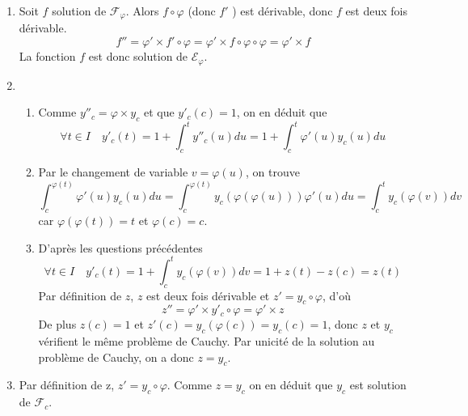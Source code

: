 \begin{enumerate}
\begin{enumerate}
\end{enumerate}
\item Soit $f$ solution de $\mathcal F_\varphi$. Alors $f\circ \varphi $  (donc $f'$ ) est dérivable, donc $f$ est deux fois dérivable.
$$f''=\varphi'\times f'\circ \varphi=\varphi'\times f\circ\varphi\circ \varphi=\varphi'\times f$$
La fonction $f$ est donc solution de $\mathcal E_\varphi$.
\item
\begin{enumerate}
\item Comme $y''_c=\varphi\times y_c$ et que $y'_c(c)=1$, on en déduit que 
$$\forall t\in I\quad y'_c(t)=1+\int_c^ty''_c(u)du=1+\int_c^t\varphi'(u)y_c(u)du$$
\item Par le changement de variable  $v=\varphi(u)$, on trouve
\begin{displaymath}
\int_c^{\varphi(t)}\varphi'(u)y_c(u)du
= \int_c^{\varphi(t)}y_c(\varphi(\varphi(u)))\varphi'(u)du
= \int_c^{t}y_c(\varphi(v))dv  
\end{displaymath}
car $\varphi(\varphi(t))=t$ et $\varphi(c)=c$. 
\item D'après les questions précédentes
$$\forall t\in I\quad y'_c(t)=1+\int_c^t y_c(\varphi(v))dv=1+z(t)-z(c)=z(t)$$
Par définition de $z$, $z$ est deux fois dérivable et $z'=y_c\circ\varphi$, d'où
$$z''=\varphi'\times y'_c\circ\varphi=\varphi'\times z$$
De plus $z(c)=1$ et $z'(c)=y_c(\varphi(c))=y_c(c)=1$, donc   
$z$ et $y_c$ vérifient le même problème de Cauchy. Par unicité de la solution au problème de Cauchy, on a donc $z=y_c$.
\end{enumerate}
\item Par définition de z, $z'=y_c\circ \varphi$. Comme $z=y_c$ on en déduit que  $y_c$ est solution de $\mathcal F_c$.

\end{enumerate}

